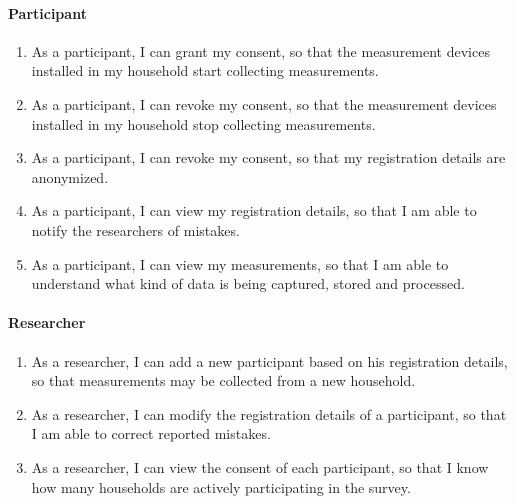 \paragraph{Participant}
\begin{enumerate}[font=\sffamily,label={\textbf{FR-\protect\twodigits{\theenumi}}},leftmargin=1.4cm, ref=FR-\protect\twodigits{\theenumi}]
	\item As a participant, I can grant my consent, so that the measurement devices installed in my household start collecting measurements.\label{itm:fr-grant-consent}
	\item As a participant, I can revoke my consent, so that the measurement devices installed in my household stop collecting measurements.\label{itm:fr-revoke-consent}
	\item As a participant, I can revoke my consent, so that my registration details are anonymized.\label{itm:fr-revoke-consent-anonymize}
	\item As a participant, I can view my registration details, so that I am able to notify the researchers of mistakes.\label{itm:fr-view-registration-details}
	\item As a participant, I can view my measurements, so that I am able to understand what kind of data is being captured, stored and processed.\label{itm:fr-view-measurements}
\end{enumerate}

\paragraph{Researcher}
\begin{enumerate}[resume, font=\sffamily,label={\textbf{FR-\protect\twodigits{\theenumi}}},leftmargin=1.4cm, ref=FR-\protect\twodigits{\theenumi}]
	\item As a researcher, I can add a new participant based on his registration details, so that measurements may be collected from a new household.\label{itm:fr-add-participant}
	\item As a researcher, I can modify the registration details of a participant, so that I am able to correct reported mistakes.\label{itm:fr-modify-registration-details}
	\item As a researcher, I can view the consent of each participant, so that I know how many households are actively participating in the survey.\label{itm:fr-view-consent}
\end{enumerate}


